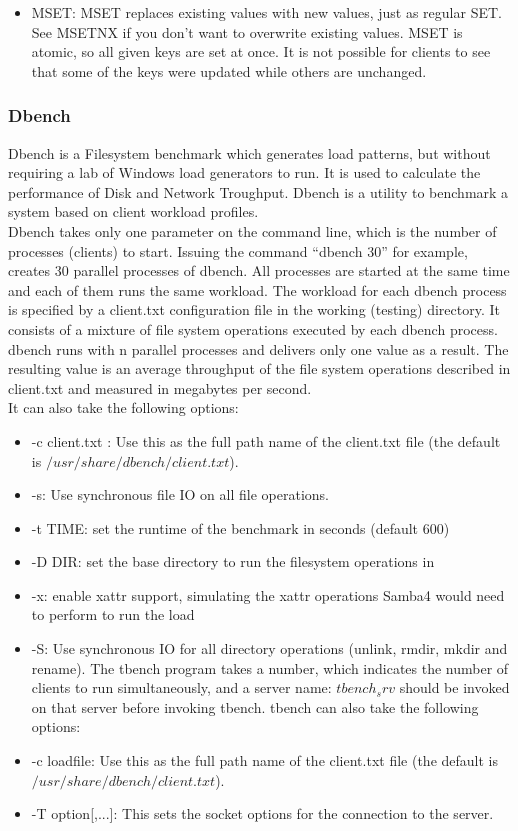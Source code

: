 \documentclass[10pt, conference]{IEEEtran}
\begin{document}
\begin{itemize}
\item MSET:  MSET replaces existing values with new values, just as regular SET. See MSETNX if you don't want to overwrite existing values. MSET is atomic, so all given keys are set at once. It is not possible for clients to see that some of the keys were updated while others are unchanged.
\end{itemize}

\subsubsection{Dbench}
\indent Dbench is a Filesystem benchmark which generates load patterns, but without requiring a lab of Windows load generators to run. It is used to calculate the performance of Disk and Network Troughput. Dbench is a utility to benchmark a system based on client workload profiles.\\
\indent Dbench takes only one parameter on the command line, which is the number of processes (clients) to start. Issuing the command “dbench 30” for example, creates 30 parallel processes of dbench. All processes are started at the same time and each of them runs the same workload. The workload for each dbench process is specified by a client.txt configuration file in the working (testing) directory. It consists of a mixture of file system operations executed by each dbench process. dbench runs with n parallel processes and delivers only one value as a result. The resulting value is an average throughput of the file system operations described in client.txt and measured in megabytes per second.\\
\indent It can also take the following options:\\

\begin{itemize}
\item -c client.txt : Use this as the full path name of the client.txt file (the default is $/usr/share/dbench/client.txt$).
\item -s: Use synchronous file IO on all file operations.
\item -t TIME: set the runtime of the benchmark in seconds (default 600)
\item -D DIR: set the base directory to run the filesystem operations in
\item -x: enable xattr support, simulating the xattr operations Samba4 would need to perform to run the load
\item -S: Use synchronous IO for all directory operations (unlink, rmdir, mkdir and rename). The tbench program takes a number, which indicates the number of clients to run simultaneously,  and a server name: $tbench_srv$ should be invoked on that server before invoking tbench. tbench can also take the following options:
\item -c loadfile: Use this as the full path name of the client.txt file (the default is $/usr/share/dbench/client.txt$).
\item -T option[,...]: This sets the socket options for the connection to the server. 
\end{itemize}
\end{document}
